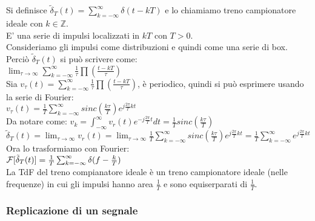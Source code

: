 	Si definisce $  \tilde{\delta}_T (t) = \sum_{k= -\infty}^{\infty} \delta (t - kT) $ e lo chiamiamo treno campionatore ideale con $ k \in \mathbb{Z} $.\\
	E' una serie di impulsi localizzati in $kT$ con $T>0$.\\
	Consideriamo gli impulsi come distribuzioni e quindi come una serie di box.\\
	Perciò $ \tilde{\delta}_T (t) $ si può scrivere come:\\
	
	$  \lim_{ \tau \to \infty} \sum_{k= -\infty}^{\infty} \frac{1}{\tau} \prod (\frac{t-kT}{\tau}) $\\
	
	Sia $ v_\tau (t) = \sum_{k= -\infty}^{\infty} \frac{1}{\tau} \prod (\frac{t-kT}{\tau}) $, è periodico, quindi si può esprimere usando la serie di Fourier:\\
	
	$
		v_\tau (t)
		= \frac{1}{T}\sum_{k= -\infty}^{\infty} sinc(\frac{k \tau}{T}) e^{j \frac{2\pi}{T} kt}
	$\\
	
	Da notare come:
	$
		v_k
		= \int_{- \infty}^{ \infty} v_r(t) e^{ -j \frac{2 \pi}{T} t} dt
		= \frac{1}{T}sinc(\frac{k \tau}{T})
	$\\
	
	$
		\tilde{\delta}_T (t)
		= \lim_{ \tau \to \infty} v_r(t)
		= \lim_{ \tau \to \infty} \frac{1}{T} \sum_{k= -\infty}^{\infty} sinc(\frac{k \tau}{T}) e^{j \frac{2 \pi}{T}k t}
		= \frac{1}{T} \sum_{k= -\infty}^{\infty} e^{j \frac{2 \pi}{T}k t}
	$\\

	
	Ora lo trasformiamo con Fourier:\\
	$ \mathcal{F} [ \tilde{\delta}_T (t) ] = \frac{1}{T} \sum_{k= -\infty}^{\infty} \delta (f-\frac{k}{T}) $\\
	La TdF del treno compianatore ideale è un treno campionatore ideale (nelle frequenze) in cui gli impulsi hanno area $ \frac{1}{T}$ e sono equiserparati di $ \frac{1}{T} $.\\
	
	
	\subsubsection{Replicazione di un segnale}
	
